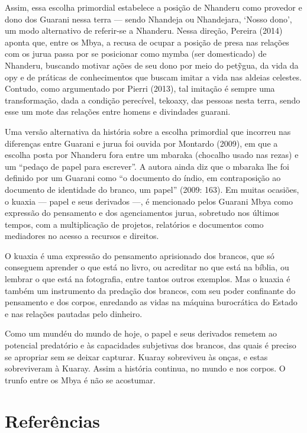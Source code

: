Assim, essa escolha primordial estabelece a posição de Nhanderu como
provedor e dono dos Guarani nessa terra — sendo Nhandeja ou Nhandejara,
‘Nosso dono’, um modo alternativo de referir-se a Nhanderu. Nessa
direção, Pereira (2014) aponta que, entre os Mbya, a recusa de ocupar a
posição de presa nas relações com os jurua passa por se posicionar como
mymba (ser domesticado) de Nhanderu, buscando motivar ações de seu dono
por meio do pet\~{y}gua, da vida da opy e de práticas de conhecimentos
que buscam imitar a vida nas aldeias celestes. Contudo, como
argumentado por Pierri (2013), tal imitação é sempre uma transformação,
dada a condição perecível, tekoaxy, das pessoas nesta terra, sendo esse
um mote das relações entre homens e divindades guarani.

Uma versão alternativa da história sobre a escolha primordial que
incorreu nas diferenças entre Guarani e jurua foi ouvida por Montardo
(2009), em que a escolha posta por Nhanderu fora entre um mbaraka
(chocalho usado nas rezas) e um ``pedaço de papel para escrever''. A
autora ainda diz que o mbaraka lhe foi definido por um Guarani como ``o
documento do índio, em contraposição ao documento de identidade do
branco, um papel'' (2009: 163). Em muitas ocasiões, o kuaxia — papel e
seus derivados —, é mencionado pelos Guarani Mbya como expressão do
pensamento e dos agenciamentos jurua, sobretudo nos últimos tempos, com
a multiplicação de projetos, relatórios e documentos como mediadores no
acesso a recursos e direitos.

O kuaxia é uma expressão do pensamento aprisionado dos brancos, que só
conseguem aprender o que está no livro, ou acreditar no que está na
bíblia, ou lembrar o que está na fotografia, entre tantos outros
exemplos. Mas o kuaxia é também um instrumento da predação dos brancos,
com seu poder confinante do pensamento e dos corpos, enredando as vidas
na máquina burocrática do Estado e nas relações pautadas pelo dinheiro.


Como um mundéu do mundo de hoje, o papel e seus derivados remetem ao
potencial predatório e às capacidades subjetivas dos brancos, das quais
é preciso se apropriar sem se deixar capturar. Kuaray sobreviveu às
onças, e estas sobreviveram à Kuaray. Assim a história continua, no
mundo e nos corpos. O trunfo entre os Mbya é não se acostumar.

\section{Referências}  

